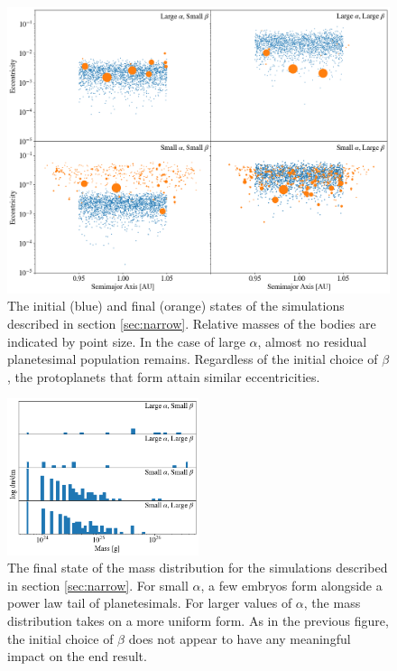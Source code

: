 \documentclass[twocolumn]{aastex63}
\begin{document}

\begin{figure}
\begin{center}
    \includegraphics[width=\textwidth]{figures/alpha_beta.png}
    \caption{The initial (blue) and final (orange) states of the simulations described in section \ref{sec:narrow}. Relative masses of the bodies are indicated by point size. In the case of large $\alpha$, almost no residual planetesimal population remains. Regardless of the initial choice of $\beta$, the protoplanets that form attain similar eccentricities. \label{fig:alpha_beta}}
\end{center}
\end{figure}

\begin{figure}
\begin{center}
    \includegraphics[width=0.5\textwidth]{figures/alpha_beta_mass.png}
    \caption{The final state of the mass distribution for the
      simulations described in section \ref{sec:narrow}. For small
      $\alpha$, a few embryos form alongside a power law tail of
      planetesimals. For larger values of $\alpha$, the mass
      distribution takes on a more uniform form. As in the previous figure, the initial choice of $\beta$ does not appear to have any meaningful impact on the end result.\label{fig:alpha_beta_mass}}
\end{center}
\end{figure}
\end{document}
